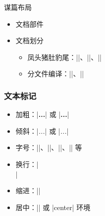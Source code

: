   \begin{frame}[fragile]{谋篇布局}
  \begin{itemize}
    \item 文档部件
  
  
    \item 文档划分
  
      \begin{itemize}
        \item 凤头猪肚豹尾：|\frontmatter|、|\mainmatter|、|\backmatter|
        \item 分文件编译：||、||
      \end{itemize}
  \end{itemize}
  \end{frame}

  \begin{frame}[fragile]
    \frametitle{文本标记}
    \begin{itemize}
      \item 加粗：|{\bfseries ...}| 或 |\textbf{...}|
      \item 倾斜：|{\itshape ...}| 或 |\textit{...}|
      \item 字号：|\tiny|、|\small|、|\large|、|\Large| 等
      \item 换行：|\\|
      \item 缩进：|\indent|
      \item 居中：|\centering| 或 |center| 环境
    \end{itemize}
  \end{frame}
    

